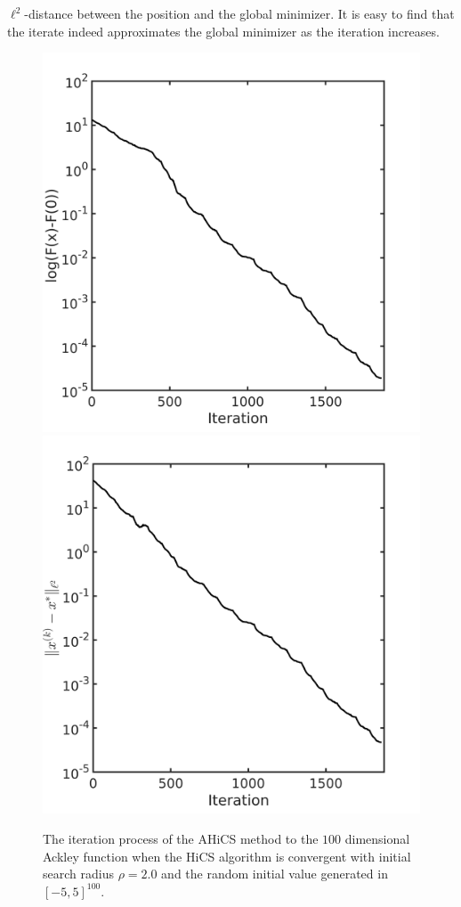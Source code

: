 \documentclass[final,1p,times]{elsarticle}
\begin{document}
$\ell^2$-distance between the position and the global minimizer. 
It is easy to find that the iterate indeed approximates the
global minimizer as the iteration increases.
\begin{figure}[!htbp]
	\centering
	  \includegraphics[scale=0.2]{../figures/ackley100D.png}
	  \includegraphics[scale=0.2]{../figures/ackley100D_dist.png}
	  \caption{The iteration process of the AHiCS method to the $100$
	  dimensional Ackley function when the HiCS algorithm is
	  convergent with initial search radius $\rho=2.0$ and the random
	  initial value generated in $[-5,5]^{100}$.}
	  \label{fig:ackley100D:AHiCS}
\end{figure}
\end{document}
